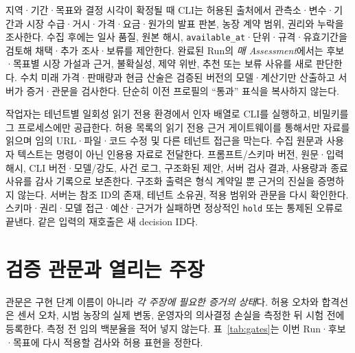 \documentclass[11pt,a4paper]{article}
\begin{document}
지역·기간·목표와 결정 시각이 확정될 때 CLI는 허용된 출처에서 관측소·변수·기간과 시장 수급·거시·가격·요금·원가의 발표 판본, 농장 계약 범위, 권리와 누락을 조사한다. 수집 후에는 일사 품질, 원본 해시, \texttt{available\_at}·단위·규격·유효기간을 검토해 채택·추가 조사·보류를 제안한다. 완료된 Run의 \emph{매 Assessment}에서는 후보·목표별 시장 가설과 근거, 불확실성, 제약 위반, 추천 또는 보류 사유를 새로 판단한다. 수치 미래 가격·판매량과 현금 산술은 검증된 버전의 모델·계산기만 산출하고 서버가 증거·관문을 검사한다. 단순히 이전 프로필의 ``통과'' 표식을 복사하지 않는다.

작업자는 테넌트별 일회성 읽기 전용 환경에서 인자 배열로 CLI를 실행하고, 비밀키를 그 프로세스에만 공급한다. 허용 목록의 읽기 전용 근거 게이트웨이를 통해서만 자료를 읽으며 임의 URL·파일·코드 수정 및 다른 테넌트 접근을 막는다. 수집 원문과 사용자 텍스트는 명령이 아닌 인용용 자료로 전달한다. 프롬프트/스키마 버전, 원문·입력 해시, CLI 버전·모델/강도, 사건 로그, 구조화된 제안, 서버 검사 결과, 사용량과 종료 사유를 감사 기록으로 보존한다. 구조화 출력은 형식 계약일 뿐 근거의 진실을 증명하지 않는다. 서버는 참조 ID의 존재, 테넌트 소유권, 적용 범위와 관문을 다시 확인한다. 스키마·권리·모델 접근·예산·근거가 실패하면 정상적인 \texttt{hold} 또는 통제된 오류로 끝낸다. 같은 입력의 재호출은 새 decision ID다.

\section{검증 관문과 열리는 주장}
관문은 구현 단계 이름이 아니라 \emph{각 주장에 필요한 증거의 상태}다. 허용 오차와 합격선은 센서 오차, 시범 농장의 실제 변동, 운영자의 의사결정 손실을 측정한 뒤 시험 전에 등록한다. 측정 전 임의 백분율을 적어 넣지 않는다. 표~\ref{tab:gates}는 이번 Run·후보·목표에 다시 적용할 검사와 허용 표현을 정한다.
\end{document}
